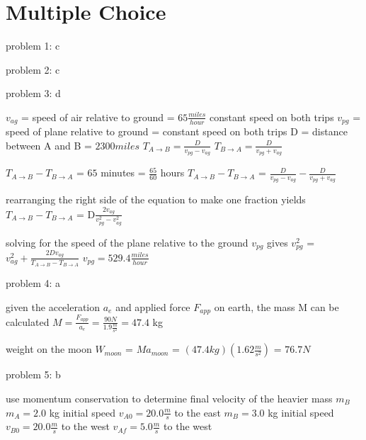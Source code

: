 \chapter{Multiple Choice}
\label{Multiple Choice}
problem 1: c

problem 2: c

problem 3: d

$v_{ag}$ = speed of air relative to ground = $65 \frac{miles}{hour}$ constant speed on both trips
$v_{pg}$ = speed of plane relative to ground = constant speed on both trips
D = distance between A and B = $2300 miles$
$T_{A \rightarrow B} = \frac{D}{v_{pg} - v_{ag}}$
$T_{B \rightarrow A} = \frac{D}{v_{pg} + v_{ag}}$
                                                                 
$T_{A \rightarrow B} - T_{B \rightarrow A}$ = $65$ minutes = $\frac{65}{60}$ hours
$T_{A \rightarrow B} - T_{B \rightarrow A}$ = $\frac{D}{v_{pg} - v_{ag}} - \frac{D}{v_{pg} + v_{ag}}$
                                                                   
rearranging the right side of the equation to make one fraction yields
$T_{A \rightarrow B} - T_{B \rightarrow A}$ = D$\frac{2v_{ag}}{v_{pg}^{2} - v_{ag}^{2}}$

                                                                 
solving for the speed of the plane relative to the ground $v_{pg}$ gives
$v_{pg}^{2}$ = $v_{ag}^{2} + \frac{2Dv_{ag}}{T_{A \rightarrow B} - T_{B \rightarrow A}}$
$v_{pg} = 529.4 \frac{miles}{hour}$

problem 4: a
                                                     
given the acceleration $a_{e}$ and applied force $F_{app}$ on earth, the mass M can be calculated
$M = \frac{F_{app}}{a_{e}} = \frac{90 N}{1.9 \frac{m}{s^{2}}} = 47.4$ kg
                                              
weight on the moon $W_{moon}$ = $Ma_{moon}$ = $(47.4 kg)(1.62 \frac{m}{s^{2}} )$ = $76.7 N$

problem 5: b

use momentum conservation to determine final velocity of the heavier mass $m_{B}$
$m_{A} = 2.0$ kg  initial speed $v_{A0} = 20.0 \frac{m}{s}$ to the east
$m_{B} = 3.0$ kg  initial speed $v_{B0} = 20.0 \frac{m}{s}$ to the west
$v_{Af} = 5.0 \frac{m}{s}$ to the west

